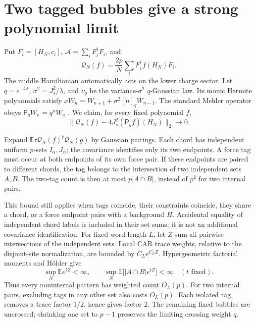 \documentclass[11pt,a4paper]{article}
\newcommand{\EE}{\mathbb E}
\newcommand{\Mq}{\mathsf P_q}
\begin{document}
\newpage
\section{Two tagged bubbles give a strong polynomial limit}
Put $F_i=[H_N,c_i]$, $\mathcal A=\sum_iF_i^\dagger F_i$, and
\begin{equation}
 \mathcal Q_N(f)=\frac{2p}{N}\sum_iF_i^\dagger f(H_N)F_i.
\end{equation}
The middle Hamiltonian automatically acts on the lower charge sector.
Let $q=e^{-4\lambda}$, $\sigma^2=J_s^2/\lambda$, and $\nu_q$ be
the variance-$\sigma^2$ $q$-Gaussian law. Its monic Hermite polynomials
satisfy $xW_n=W_{n+1}+\sigma^2[n]_qW_{n-1}$.
The standard Mehler operator obeys $\Mq W_n=q^nW_n$ \cite{BKS}.
We claim, for every fixed polynomial $f$,
\begin{equation}
 \|\mathcal Q_N(f)-4J_s^2(\Mq f)(H_N)\|_2\longrightarrow0.
 \label{eq:poly}
\end{equation}

Expand $\EE\tau\mathcal Q_N(f)^\dagger\mathcal Q_N(g)$ by Gaussian
pairings. Each chord has independent uniform $p$-sets $I_\alpha,J_\alpha$;
the covariance identifies only its two endpoints. A force tag must
occur at both endpoints of its own force pair. If these endpoints
are paired to different chords, the tag belongs to the intersection
of two independent sets $A,B$. The two-tag count is then at most
$p|A\cap B|$, instead of $p^2$ for two internal pairs.

This bound still applies when tags coincide, their constraints coincide,
they share a chord, or a force endpoint pairs with a background $H$.
Accidental equality of independent chord labels is included in their
set sums; it is not an additional covariance identification.
For fixed word length $L$, let $Z$ sum all pairwise intersections
of the independent sets. Local CAR trace weights, relative to the
disjoint-site normalization, are bounded by $C_L e^{C_LZ}$.
Hypergeometric factorial moments and H\"older give
\begin{equation}
 \sup_N\EE e^{tZ}<\infty,\qquad
 \sup_N\EE\big[|A\cap B|e^{tZ}\big]<\infty
 \quad(t\text{ fixed}).
\end{equation}
Thus every noninternal pattern has weighted count $O_L(p)$.
For two internal pairs, excluding tags in any other set also costs
$O_L(p)$. Each isolated tag removes a trace factor $1/2$, hence gives
factor $2$. The remaining fixed bubbles are uncrossed; shrinking one
set to $p-1$ preserves the limiting crossing weight $q$.
\end{document}
